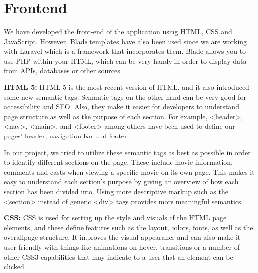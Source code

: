 \section{Frontend}


We have developed the front-end of the application using HTML, CSS and JavaScript.
However, Blade templates have also been used since we are working with Laravel which is a framework that incorporates them.
Blade allows you to use PHP within your HTML, which can be very handy in order to display data from APIs, databases or other sources.\newline

\textbf{HTML 5:} \newline
HTML 5 is the most recent version of HTML, and it also introduced some new semantic tags.
Semantic tags on the other hand can be very good for accessibility and SEO.
Also, they make it easier for developers to understand page structure as well as the purpose of each section.
For example, \textless{}header\textgreater{}, \textless{}nav\textgreater{}, \textless{}main\textgreater{}, and \textless{}footer\textgreater{} among others have been used to define our pages’ header, navigation bar and footer.\newline

In our project, we tried to utilize these semantic tags as best as possible in order to identify different sections on the page.
These include movie information, comments and casts when viewing a specific movie on its own page.
This makes it easy to understand each section’s purpose by giving an overview of how each section has been divided into.
Using more descriptive markup such as the \textless{}section\textgreater{} instead of generic \textless{}div\textgreater{} tags provides more meaningful semantics.\newline

\textbf{CSS:} \newline
CSS is used for setting up the style and visuals of the HTML page elements,
and these define features such as the layout, colors, fonts, as well as the overallpage structure.
It improves the visual appearance and can also make it user-friendly with things like animations on hover, transitions or a number of other CSS3 capabilities that may indicate to a user that an element can be clicked.\newline

